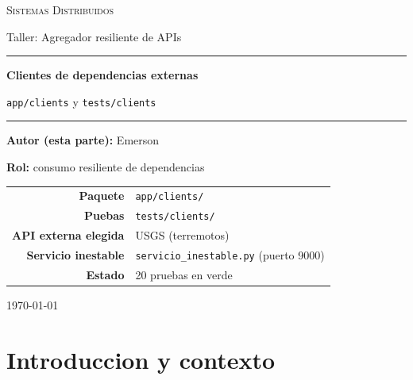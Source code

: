 \documentclass[11pt,a4paper]{article}
\newcommand{\arch}[1]{\texttt{#1}}
\begin{document}
\begin{titlepage}
  \centering
  \vspace*{2.2cm}
  {\scshape\Large Sistemas Distribuidos \par}
  \vspace{0.4cm}
  {\large Taller: Agregador resiliente de APIs \par}
  \vspace{2.5cm}
  \rule{\linewidth}{0.5pt}\par
  \vspace{0.6cm}
  {\Huge\bfseries Clientes de dependencias externas \par}
  \vspace{0.4cm}
  {\Large \arch{app/clients} \; y \; \arch{tests/clients} \par}
  \vspace{0.6cm}
  \rule{\linewidth}{0.5pt}\par
  \vspace{2.2cm}

  {\large \textbf{Autor (esta parte):} Emerson \par}
  \vspace{0.2cm}
  {\large \textbf{Rol:} consumo resiliente de dependencias \par}
  \vspace{1.6cm}

  \begin{tabular}{rl}
    \toprule
    \textbf{Paquete} & \arch{app/clients/} \\
    \textbf{Puebas}  & \arch{tests/clients/} \\
    \textbf{API externa elegida} & USGS (terremotos) \\
    \textbf{Servicio inestable} & \arch{servicio\_inestable.py} (puerto 9000) \\
    \textbf{Estado} & 20 pruebas en verde \\
    \bottomrule
  \end{tabular}

  \vfill
  {\large \today \par}
\end{titlepage}

\tableofcontents
\newpage

\section{Introduccion y contexto}
\end{document}
